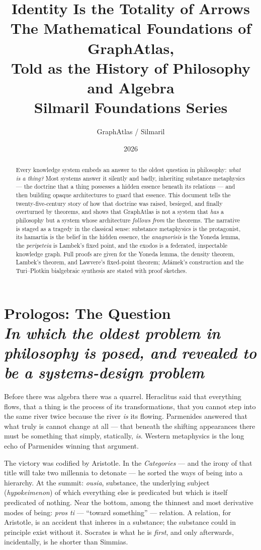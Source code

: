 \documentclass[11pt]{article}
\title{\color{silmaril}\textbf{Identity Is the Totality of Arrows}\\[0.6ex]
\large The Mathematical Foundations of GraphAtlas,\\
Told as the History of Philosophy and Algebra\\[0.4ex]
\normalsize Silmaril Foundations Series}
\author{GraphAtlas / Silmaril}
\date{2026}
\theoremstyle{plain}
\theoremstyle{definition}
\theoremstyle{remark}
\newcommand{\act}[2]{\section{#1 \\ {\normalsize\normalfont\itshape #2}}}
\begin{document}
\maketitle

\begin{abstract}
\noindent Every knowledge system embeds an answer to the oldest question in philosophy: \emph{what is a thing?} Most systems answer it silently and badly, inheriting substance metaphysics --- the doctrine that a thing possesses a hidden essence beneath its relations --- and then building opaque architectures to guard that essence. This document tells the twenty-five-century story of how that doctrine was raised, besieged, and finally overturned by theorems, and shows that GraphAtlas is not a system that \emph{has} a philosophy but a system whose architecture \emph{follows from} the theorems. The narrative is staged as a tragedy in the classical sense: substance metaphysics is the protagonist, its hamartia is the belief in the hidden essence, the \emph{anagnorisis} is the Yoneda lemma, the \emph{peripeteia} is Lambek's fixed point, and the exodos is a federated, inspectable knowledge graph. Full proofs are given for the Yoneda lemma, the density theorem, Lambek's theorem, and Lawvere's fixed-point theorem; Ad\'amek's construction and the Turi--Plotkin bialgebraic synthesis are stated with proof sketches.
\end{abstract}

\tableofcontents
\newpage

\act{Prologos: The Question}{In which the oldest problem in philosophy is posed, and revealed to be a systems-design problem}

Before there was algebra there was a quarrel. Heraclitus said that everything flows, that a thing is the process of its transformations, that you cannot step into the same river twice because the river \emph{is} its flowing. Parmenides answered that what truly is cannot change at all --- that beneath the shifting appearances there must be something that simply, statically, \emph{is}. Western metaphysics is the long echo of Parmenides winning that argument.

The victory was codified by Aristotle. In the \emph{Categories} --- and the irony of that title will take two millennia to detonate --- he sorted the ways of being into a hierarchy. At the summit: \emph{ousia}, substance, the underlying subject (\emph{hypokeimenon}) of which everything else is predicated but which is itself predicated of nothing. Near the bottom, among the thinnest and most derivative modes of being: \emph{pros ti} --- ``toward something'' --- relation. A relation, for Aristotle, is an accident that inheres in a substance; the substance could in principle exist without it. Socrates is what he is \emph{first}, and only afterwards, incidentally, is he shorter than Simmias.
\end{document}
